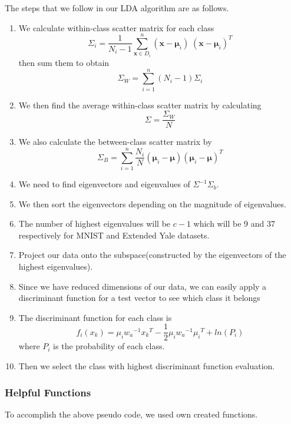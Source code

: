 The steps that we follow in our LDA algorithm are as follows.
 
\begin{enumerate}
	
	\item We calculate within-class scatter matrix for each class
          \begin{equation}
            \Sigma_i = \frac{1}{N_{i}-1} \sum\limits_{\pmb x \in D_i}^n (\pmb x - \pmb \mu_i)\;(\pmb x - \pmb \mu_i)^T
          \end{equation} 
          then sum them to obtain
          \begin{equation}
             \Sigma_W = \sum\limits_{i =1}^{n} (N_i - 1) \Sigma_i 
          \end{equation}
	\item We then find the average within-class scatter matrix by calculating 
          \begin{equation}
            \Sigma =\dfrac{\Sigma_W}{N}
          \end{equation}
	\item We also calculate the between-class scatter matrix by 
          \begin{equation}
            \Sigma_B = \sum\limits_{i =1}^n \dfrac{N_i}{N} (\pmb \mu_i - \pmb \mu) (\pmb \mu_i - \pmb \mu)^T
          \end{equation}
	\item We need to find eigenvectors and eigenvalues of $\Sigma^{-1} \Sigma_b$.
	\item We then sort the eigenvectors depending on the magnitude of eigenvalues.
	\item The number of highest eigenvalues will be $c-1$ which will be 9 and 37 respectively for MNIST and Extended Yale datasets.
	\item Project our data onto the subspace(constructed by the eigenvectors of the highest eigenvalues).
	\item Since we have reduced dimensions of our data, we can easily apply a discriminant function for a test vector to see which class it belongs
	\item The discriminant function for each class is 
          \begin{equation}
            f_i(x_k) = \mu_i {w_a}^{-1} {x_k}^T - \dfrac{1}{2} \mu_i {w_a}^{-1} {\mu_i}^T + ln(P_i)
          \end{equation} 
          where $P_i$ is the probability of each class.
	\item Then we select the class with highest discriminant function evaluation.
\end{enumerate}

\subsubsection{Helpful Functions}

To accomplish the above pseudo code, we used own created functions.
